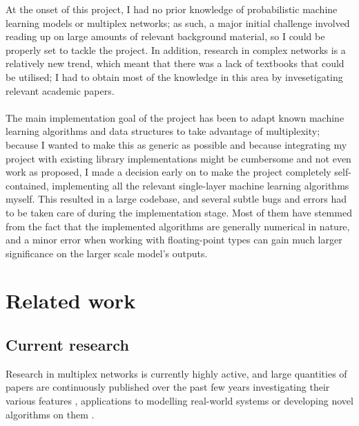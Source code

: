 \documentclass[12pt,a4paper,twoside,openright]{report}
\begin{document}
At the onset of this project, I had no prior knowledge of probabilistic machine learning models or multiplex networks; as such, a major initial challenge involved reading up on large amounts of relevant background material, so I could be properly set to tackle the project. In addition, research in complex networks is a relatively new trend, which meant that there was a lack of textbooks that could be utilised; I had to obtain most of the knowledge in this area by invesetigating relevant academic papers. \\ \\
The main implementation goal of the project has been to adapt known machine learning algorithms and data structures to take advantage of multiplexity; because I wanted to make this as generic as possible and because integrating my project with existing library implementations might be cumbersome and not even work as proposed, I made a decision early on to make the project completely self-contained, implementing all the relevant single-layer machine learning algorithms myself. This resulted in a large codebase, and several subtle bugs and errors had to be taken care of during the implementation stage. Most of them have stemmed from the fact that the implemented algorithms are generally numerical in nature, and a minor error when working with floating-point types can gain much larger significance on the larger scale model's outputs.

\section{Related work}

\subsection{Current research}

Research in multiplex networks is currently highly active, and large quantities of papers are continuously published over the past few years investigating their various features \cite{asllani2014turing, bianconi2013statistical, nicosia2013growing}, applications to modelling real-world systems \cite{estrada2014communicability, granell2014competing, hu2014conditions, zhao2014multiple} or developing novel algorithms on them \cite{azimi2014k, loe2014comparison}.
\end{document}
